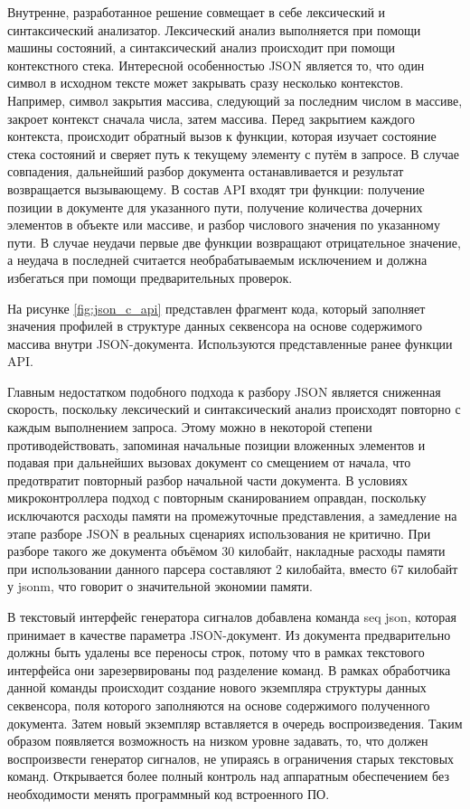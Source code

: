 \documentclass{report}
\begin{document}
Внутренне, разработанное решение совмещает в себе лексический и синтаксический анализатор. Лексический анализ выполняется при помощи машины состояний, а синтаксический анализ происходит при помощи контекстного стека. Интересной особенностью JSON является то, что один символ в исходном тексте может закрывать сразу несколько контекстов. Например, символ закрытия массива, следующий за последним числом в массиве, закроет контекст сначала числа, затем массива. Перед закрытием каждого контекста, происходит обратный вызов к функции, которая изучает состояние стека состояний и сверяет путь к текущему элементу с путём в запросе. В случае совпадения, дальнейший разбор документа останавливается и результат возвращается вызывающему. В состав API входят три функции: получение позиции в документе для указанного пути, получение количества дочерних элементов в объекте или массиве, и разбор числового значения по указанному пути. В случае неудачи первые две функции возвращают отрицательное значение, а неудача в последней считается необрабатываемым исключением и должна избегаться при помощи предварительных проверок.

На рисунке \ref{fig:json_c_api} представлен фрагмент кода, который заполняет значения профилей в структуре данных секвенсора на основе содержимого массива внутри JSON-документа. Используются представленные ранее функции API.


Главным недостатком подобного подхода к разбору JSON является сниженная скорость, поскольку лексический и синтаксический анализ происходят повторно с каждым выполнением запроса. Этому можно в некоторой степени противодействовать, запоминая начальные позиции вложенных элементов и подавая при дальнейших вызовах документ со смещением от начала, что предотвратит повторный разбор начальной части документа. В условиях микроконтроллера подход с повторным сканированием оправдан, поскольку исключаются расходы памяти на промежуточные представления, а замедление на этапе разборе JSON в реальных сценариях использования не критично. При разборе такого же документа объёмом 30 килобайт, накладные расходы памяти при использовании данного парсера составляют 2 килобайта, вместо 67 килобайт у jsonm, что говорит о значительной экономии памяти.

В текстовый интерфейс генератора сигналов добавлена команда seq json, которая принимает в качестве параметра JSON-документ. Из документа предварительно должны быть удалены все переносы строк, потому что в рамках текстового интерфейса они зарезервированы под разделение команд. В рамках обработчика данной команды происходит создание нового экземпляра структуры данных секвенсора, поля которого заполняются на основе содержимого полученного документа. Затем новый экземпляр вставляется в очередь воспроизведения. Таким образом появляется возможность на низком уровне задавать, то, что должен воспроизвести генератор сигналов, не упираясь в ограничения старых текстовых команд. Открывается более полный контроль над аппаратным обеспечением без необходимости менять программный код встроенного ПО.
\end{document}
